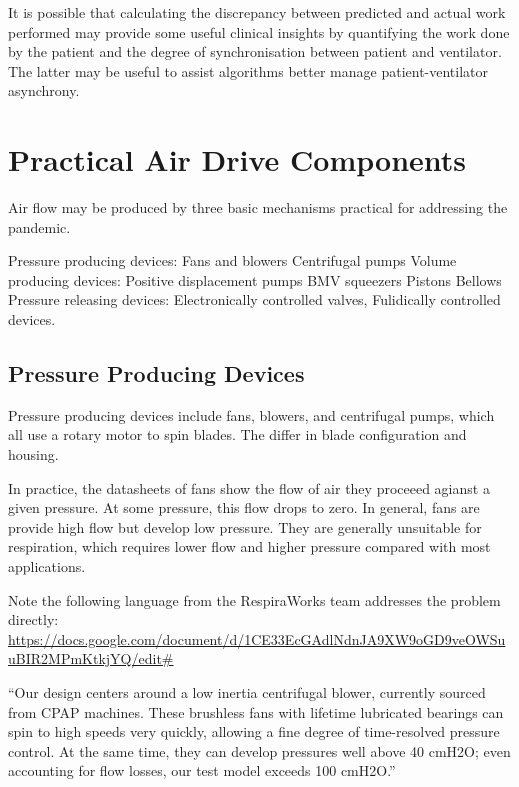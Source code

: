 \documentclass[conference]{article}
\begin{document}
It is possible that calculating the discrepancy between predicted and actual work performed may provide
some useful clinical insights by quantifying the work done by the patient and the degree of synchronisation
between patient and ventilator. The latter may be useful to assist algorithms better manage patient-ventilator asynchrony.


\section{Practical Air Drive Components}

Air flow may be produced by three basic mechanisms practical for addressing the pandemic.

\begin{outline}
  \1 Pressure producing devices:
  \2 Fans and blowers
  \2 Centrifugal pumps
  \1 Volume producing devices:
  \2 Positive displacement pumps
  \2 BMV squeezers
  \2 Pistons
  \2 Bellows
  \1 Pressure releasing devices:
  \2 Electronically controlled valves,
  \2 Fulidically controlled devices.
\end{outline}


\subsection{Pressure Producing Devices}

Pressure producing devices include fans, blowers, and centrifugal pumps, which
all use a rotary motor to spin blades. The differ in blade configuration and
housing.

In practice, the datasheets of fans show the flow of air they proceeed agianst a given pressure. At some pressure,
this flow drops to zero. In general, fans are provide high flow but develop low pressure. They are generally unsuitable
for respiration, which requires lower flow and higher pressure
compared with most applications.


Note the following language from the RespiraWorks team addresses the problem directly:
\url{https://docs.google.com/document/d/1CE33EcGAdlNdnJA9XW9oGD9veOWSuuBIR2MPmKtkjYQ/edit#}

``Our design centers around a low inertia centrifugal blower, currently sourced from CPAP machines. These brushless fans with lifetime lubricated bearings can spin to high speeds very quickly, allowing a fine degree of time-resolved pressure control. At the same time, they can develop pressures well above 40 cmH2O; even accounting for flow losses, our test model exceeds 100 cmH2O.''
\end{document}
